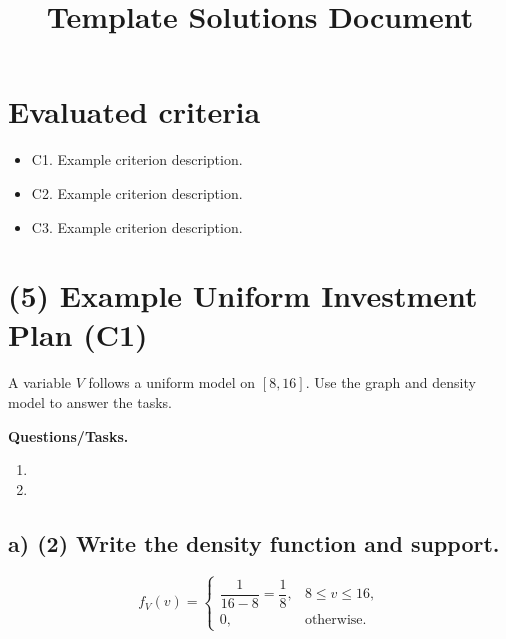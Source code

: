 \makeatletter
{}
\makeatother






\title{Template Solutions Document}
\author{}
\date{}


\maketitle

\setcounter{tocdepth}{1}
\setcounter{secnumdepth}{2}
\label{toc}
\tableofcontents

\section*{Evaluated criteria}
\begin{itemize}
    \item C1. Example criterion description.
    \item C2. Example criterion description.
    \item C3. Example criterion description.
\end{itemize}

\section{(5) Example Uniform Investment Plan (C1)}
\label{sec:example-uniform-investment-plan-c1}
A variable $V$ follows a uniform model on $[8,16]$. Use the graph and density model to answer the tasks.

\textbf{Questions/Tasks.}
\begin{enumerate}[label=\textbf{\alph*)}]
    \item {}
    \item {}
\end{enumerate}

\subsection*{a) \textbf{(2)} Write the density function and support.}
\label{subsec:example-uniform-investment-plan-c1-a}
\[
f_V(v)=\begin{cases}
\dfrac{1}{16-8}=\dfrac18, & 8\le v\le 16,\\
0, & \text{otherwise.}
\end{cases}
\]

